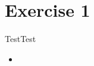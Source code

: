 \section{Exercise 1}

\begin{frame}[fragile]{Test}{Test}
  \begin{itemize}
    \item {}
  \end{itemize}
\end{frame}
